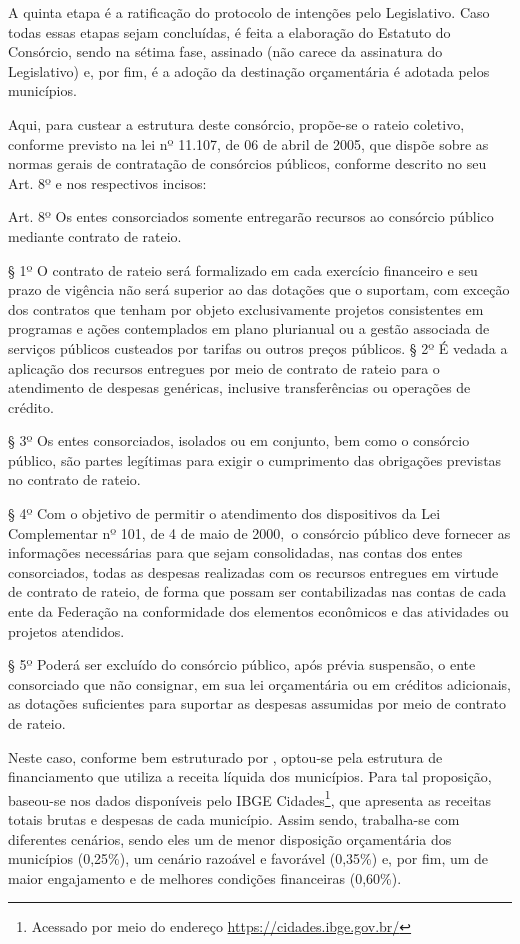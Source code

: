 	A quinta etapa é a ratificação do protocolo de intenções pelo Legislativo. Caso todas essas etapas sejam concluídas, é feita a elaboração do Estatuto do Consórcio, sendo na sétima fase, assinado (não carece da assinatura do Legislativo) e, por fim, é a adoção da destinação orçamentária é adotada pelos municípios.
	
	Aqui, para custear a estrutura deste consórcio, propõe-se o rateio coletivo, conforme previsto na lei nº 11.107, de 06 de abril de 2005, que dispõe sobre as normas gerais de contratação de consórcios públicos, conforme descrito no seu Art. 8º e nos respectivos incisos:
	
	\begin{citacao}
		Art. 8º Os entes consorciados somente entregarão recursos ao consórcio público mediante contrato de rateio.
		
		§ 1º O contrato de rateio será formalizado em cada exercício financeiro e seu prazo de vigência não será superior ao das dotações que o suportam, com exceção dos contratos que tenham por objeto exclusivamente projetos consistentes em programas e ações contemplados em plano plurianual ou a gestão associada de serviços públicos custeados por tarifas ou outros preços públicos.
		§ 2º É vedada a aplicação dos recursos entregues por meio de contrato de rateio para o atendimento de despesas genéricas, inclusive transferências ou operações de crédito.
		
		§ 3º Os entes consorciados, isolados ou em conjunto, bem como o consórcio público, são partes legítimas para exigir o cumprimento das obrigações previstas no contrato de rateio.
		
		§ 4º Com o objetivo de permitir o atendimento dos dispositivos da Lei Complementar nº 101, de 4 de maio de 2000, o consórcio público deve fornecer as informações necessárias para que sejam consolidadas, nas contas dos entes consorciados, todas as despesas realizadas com os recursos entregues em virtude de contrato de rateio, de forma que possam ser contabilizadas nas contas de cada ente da Federação na conformidade dos elementos econômicos e das atividades ou projetos atendidos.
		
		§ 5º Poderá ser excluído do consórcio público, após prévia suspensão, o ente consorciado que não consignar, em sua lei orçamentária ou em créditos adicionais, as dotações suficientes para suportar as despesas assumidas por meio de contrato de rateio. \cite{brasil2005a}
	\end{citacao}

	Neste caso, conforme bem estruturado por , optou-se pela estrutura de financiamento que utiliza a receita líquida dos municípios. Para tal proposição, baseou-se nos dados disponíveis pelo IBGE Cidades\footnote{Acessado por meio do endereço \url{https://cidades.ibge.gov.br/}}, que apresenta as receitas totais brutas e despesas de cada município. Assim sendo, trabalha-se com diferentes cenários, sendo eles um de menor disposição orçamentária dos municípios (0,25\%), um cenário razoável e favorável (0,35\%) e, por fim, um de maior engajamento e de melhores condições financeiras (0,60\%). 
	
